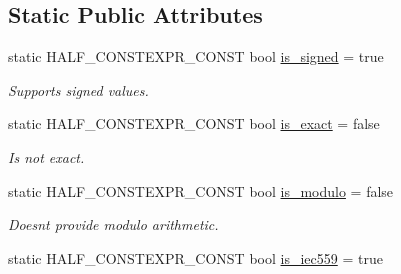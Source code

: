\subsection*{Static Public Attributes}
\begin{DoxyCompactItemize}
\item 
static H\+A\+L\+F\+\_\+\+C\+O\+N\+S\+T\+E\+X\+P\+R\+\_\+\+C\+O\+N\+ST bool \hyperlink{classstd_1_1numeric__limits_3_01half__float_1_1half_01_4_a259bf36384293f18c4fbd40011b75107}{is\+\_\+signed} = true\hypertarget{classstd_1_1numeric__limits_3_01half__float_1_1half_01_4_a259bf36384293f18c4fbd40011b75107}{}\label{classstd_1_1numeric__limits_3_01half__float_1_1half_01_4_a259bf36384293f18c4fbd40011b75107}

\begin{DoxyCompactList}\small\item\em Supports signed values. \end{DoxyCompactList}\item 
static H\+A\+L\+F\+\_\+\+C\+O\+N\+S\+T\+E\+X\+P\+R\+\_\+\+C\+O\+N\+ST bool \hyperlink{classstd_1_1numeric__limits_3_01half__float_1_1half_01_4_a503b8e3d6c6828c85b21c17fda0e2bf2}{is\+\_\+exact} = false\hypertarget{classstd_1_1numeric__limits_3_01half__float_1_1half_01_4_a503b8e3d6c6828c85b21c17fda0e2bf2}{}\label{classstd_1_1numeric__limits_3_01half__float_1_1half_01_4_a503b8e3d6c6828c85b21c17fda0e2bf2}

\begin{DoxyCompactList}\small\item\em Is not exact. \end{DoxyCompactList}\item 
static H\+A\+L\+F\+\_\+\+C\+O\+N\+S\+T\+E\+X\+P\+R\+\_\+\+C\+O\+N\+ST bool \hyperlink{classstd_1_1numeric__limits_3_01half__float_1_1half_01_4_a77ce83e1744e781334a6c7f68e2b7e38}{is\+\_\+modulo} = false\hypertarget{classstd_1_1numeric__limits_3_01half__float_1_1half_01_4_a77ce83e1744e781334a6c7f68e2b7e38}{}\label{classstd_1_1numeric__limits_3_01half__float_1_1half_01_4_a77ce83e1744e781334a6c7f68e2b7e38}

\begin{DoxyCompactList}\small\item\em Doesn\textquotesingle{}t provide modulo arithmetic. \end{DoxyCompactList}\item 
static H\+A\+L\+F\+\_\+\+C\+O\+N\+S\+T\+E\+X\+P\+R\+\_\+\+C\+O\+N\+ST bool \hyperlink{classstd_1_1numeric__limits_3_01half__float_1_1half_01_4_acdf5541f7eda3f27d4537c1e4c4528ad}{is\+\_\+iec559} = true\hypertarget{classstd_1_1numeric__limits_3_01half__float_1_1half_01_4_acdf5541f7eda3f27d4537c1e4c4528ad}{}\label{classstd_1_1numeric__limits_3_01half__float_1_1half_01_4_acdf5541f7eda3f27d4537c1e4c4528ad}


\end{DoxyCompactItemize}
